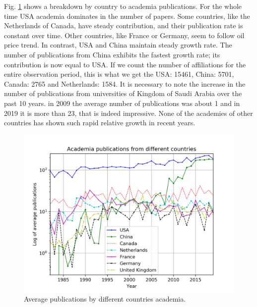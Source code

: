\documentclass[geosciences,article,submit,moreauthors,pdftex]{Definitions/mdpi}
\begin{document}
Fig. \ref{acad_countries} shows a breakdown by country to academia publications. For the whole time USA academia dominates in the number of papers. Some countries, like the Netherlands of Canada, have steady contribution, and their publication rate is constant over time. Other countries, like France or Germany, seem to follow oil price trend. In contrast, USA and China maintain steady growth rate. The number of publications from China exhibits the fastest growth rate; its contribution is now equal to USA.  If we count the number of affiliations for the entire observation period, this is what we get the USA: 15461, China: 5701, Canada: 2765 and Netherlands: 1584. It is necessary to note the increase in the number of publications from universities of Kingdom of Saudi Arabia over the past 10 years. in 2009 the average number of publications was about 1 and in 2019 it is more than 23, that is indeed impressive. None of the academies of other countries has shown such rapid relative growth in recent years.

\begin{figure}[ht!]
\centering
\includegraphics[scale=0.7]{acad_countries.png}
\caption{Average publications by different countries academia.}
\label{acad_countries}
\end{figure}
\end{document}
